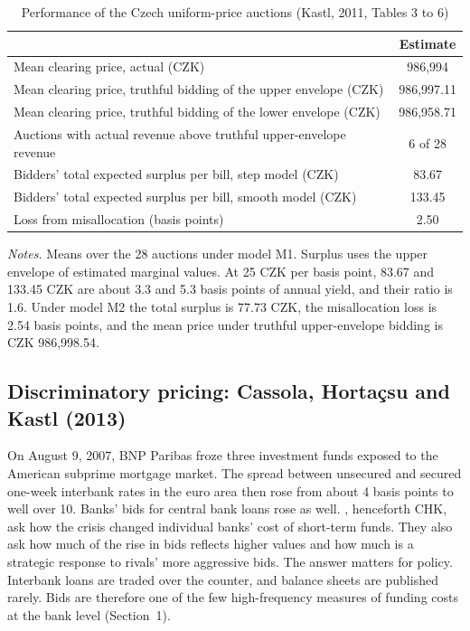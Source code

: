 \begin{table}[htbp]
\centering
\caption{Performance of the Czech uniform-price auctions (Kastl, 2011, Tables 3 to 6)}
\label{tab:15-kastl-results}
\small
\begin{tabular}{lc}
\toprule
 & Estimate\\
\midrule
Mean clearing price, actual (CZK) & 986,994\\
Mean clearing price, truthful bidding of the upper envelope (CZK) & 986,997.11\\
Mean clearing price, truthful bidding of the lower envelope (CZK) & 986,958.71\\
Auctions with actual revenue above truthful upper-envelope revenue & 6 of 28\\
\addlinespace
Bidders' total expected surplus per bill, step model (CZK) & 83.67\\
Bidders' total expected surplus per bill, smooth model (CZK) & 133.45\\
Loss from misallocation (basis points) & 2.50\\
\bottomrule
\end{tabular}

\smallskip
\begin{minipage}{0.93\textwidth}
\footnotesize \textit{Notes.} Means over the 28 auctions under model M1. Surplus uses the upper envelope of
estimated marginal values. At 25 CZK per basis point, 83.67 and 133.45 CZK are about 3.3 and 5.3 basis points
of annual yield, and their ratio is 1.6. Under model M2 the total surplus is 77.73 CZK, the misallocation loss
is 2.54 basis points, and the mean price under truthful upper-envelope bidding is CZK 986,998.54.
\end{minipage}
\end{table}

\subsection{Discriminatory pricing: \texorpdfstring{Cassola, Horta\c{c}su and Kastl}{Cassola, Hortacsu and Kastl} (2013)}\label{sec:15-chk}

 On August 9, 2007, BNP Paribas froze three investment funds exposed to the American
subprime mortgage market. The spread between unsecured and secured one-week interbank rates in the euro area
then rose from about 4 basis points to well over 10. Banks' bids for central bank loans rose as well.
\citet{CassolaHortacsuKastl2013}, henceforth CHK, ask how the crisis changed individual banks' cost of
short-term funds. They also ask how much of the rise in bids reflects higher values and how much is a
strategic response to rivals' more aggressive bids. The answer matters for policy. Interbank loans are traded
over the counter, and balance sheets are published rarely. Bids are therefore one of the few high-frequency
measures of funding costs at the bank level (Section~1).

